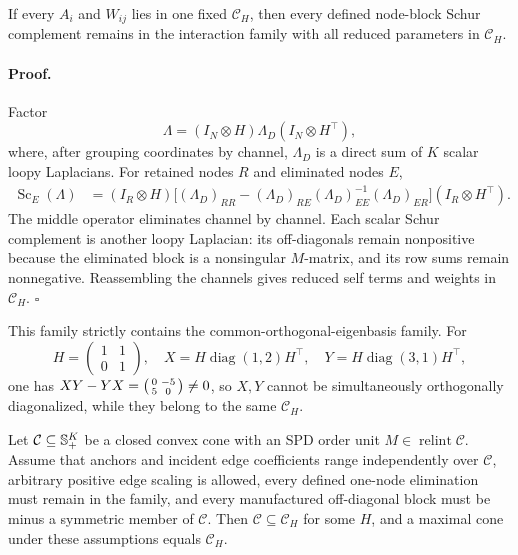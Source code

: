 If every \(A_i\) and \(W_{ij}\) lies in one fixed \(\mathcal C_H\), then
every defined node-block Schur complement remains in the interaction family
with all reduced parameters in \(\mathcal C_H\).

\paragraph{Proof.}
Factor
\begin{equation}
\Lambda=(I_N\otimes H)\Lambda_D(I_N\otimes H^\top),
\label{eq:cg-kron-congruence-factor}
\end{equation}
where, after grouping coordinates by channel, \(\Lambda_D\) is a direct sum
of \(K\) scalar loopy Laplacians. For retained nodes \(R\) and eliminated
nodes \(E\),
\begin{align}
\operatorname{Sc}_E(\Lambda)
&=(I_R\otimes H)\Big[
(\Lambda_D)_{RR}
-(\Lambda_D)_{RE}(\Lambda_D)_{EE}^{-1}(\Lambda_D)_{ER}
\Big](I_R\otimes H^\top).
\label{eq:cg-kron-congruence-schur}
\end{align}
The middle operator eliminates channel by channel. Each scalar Schur
complement is another loopy Laplacian: its off-diagonals remain nonpositive
because the eliminated block is a nonsingular \(M\)-matrix, and its row sums
remain nonnegative. Reassembling the channels gives reduced self terms and
weights in \(\mathcal C_H\). \(\square\)

This family strictly contains the common-orthogonal-eigenbasis family.
For
\[
H=\begin{pmatrix}1&1\\0&1\end{pmatrix},\quad
X=H\operatorname{diag}(1,2)H^\top,\quad
Y=H\operatorname{diag}(3,1)H^\top,
\]
one has \(XY-YX=\begin{psmallmatrix}0&-5\\5&0\end{psmallmatrix}\neq0\),
so \(X,Y\) cannot be simultaneously orthogonally diagonalized, while they
belong to the same \(\mathcal C_H\). 

Let \(\mathcal C\subseteq\mathbb S_{+}^K\) be a closed convex cone with an SPD order
unit \(M\in\operatorname{relint}\mathcal C\). Assume that anchors and incident
edge coefficients range independently over \(\mathcal C\), arbitrary positive
edge scaling is allowed, every defined one-node elimination must remain in
the family, and every manufactured off-diagonal block must be minus a
symmetric member of \(\mathcal C\). Then
\(\mathcal C\subseteq\mathcal C_H\) for some \(H\), and a maximal cone under
these assumptions equals \(\mathcal C_H\). 

